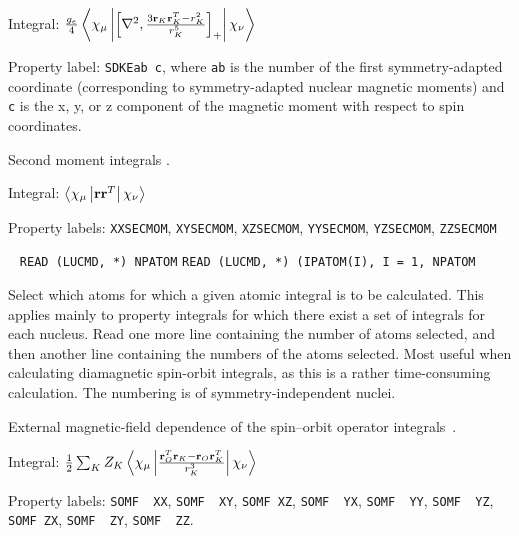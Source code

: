 \begin{description}
\begin{list}{}{}
\item Integral: $\frac{g_e}{4}\left<\chi_{\mu}\left|\left[\nabla^2,\frac{3{\bf
r}_K{\bf r}_K^T - r_K^2}{r_{K}^5}\right]_+\right|\chi_{\nu}\right>$
\item Property label: \verb|SDKEab c|, where \verb|ab| is the number
of the first symmetry-adapted coordinate (corresponding to
symmetry-adapted nuclear magnetic moments) and \verb|c| is the x, y,
or z component of the magnetic moment with respect to spin coordinates.
\end{list}

\item[\Key{SECMOM}] Second moment integrals
.

\begin{list}{}{}
\item Integral: $\left<\chi_{\mu}\left|{\bf r}{\bf
r}^{T}\right|\chi_{\nu}\right>$
\item Property labels: \verb|XXSECMOM|, \verb|XYSECMOM|,
\verb|XZSECMOM|, \verb|YYSECMOM|, \verb|YZSECMOM|, \verb|ZZSECMOM|
\end{list}

\item[\Key{SELECT}]\verb| |\newline
\verb|READ (LUCMD, *) NPATOM|\newline
\verb|READ (LUCMD, *) (IPATOM(I), I = 1, NPATOM|

Select which atoms for which a given atomic integral is to be
calculated. This applies mainly to property integrals for which
there exist a set of integrals for each nucleus. Read one more line
containing the number of atoms selected, and then another line
containing the numbers of the atoms selected. Most useful when
calculating diamagnetic spin-orbit
integrals, as this is a rather time-consuming calculation. The
numbering is of symmetry-independent nuclei.

\item[\Key{SOFIEL}] External magnetic-field dependence of the spin--orbit
operator integrals~\cite{jvkrovjcp111}.

\begin{list}{}{}
\item Integral:
$\frac{1}{2}\sum_KZ_K\left<\chi_{\mu}\left|\frac{{\bf r}_O^T{\bf r}_K -
{\bf r}_O{\bf r}_K^T}{r_{K}^3}\right|\chi_{\nu}\right>$
\item Property labels: \verb|SOMF  XX|, \verb|SOMF  XY|, \verb|SOMF XZ|, 
\verb|SOMF  YX|, \verb|SOMF  YY|, \verb|SOMF  YZ|, \verb|SOMF ZX|, 
\verb|SOMF  ZY|, \verb|SOMF  ZZ|. 
\end{list}


\end{description}
